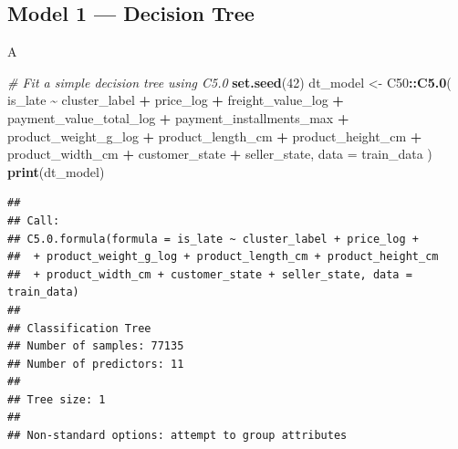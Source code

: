 \documentclass[
]{article}
\newenvironment{Shaded}{\begin{snugshade}}{\end{snugshade}}
\newcommand{\AttributeTok}[1]{\textcolor[rgb]{0.13,0.29,0.53}{#1}}
\newcommand{\CommentTok}[1]{\textcolor[rgb]{0.56,0.35,0.01}{\textit{#1}}}
\newcommand{\DecValTok}[1]{\textcolor[rgb]{0.00,0.00,0.81}{#1}}
\newcommand{\FunctionTok}[1]{\textcolor[rgb]{0.13,0.29,0.53}{\textbf{#1}}}
\newcommand{\NormalTok}[1]{#1}
\newcommand{\OtherTok}[1]{\textcolor[rgb]{0.56,0.35,0.01}{#1}}
\newcommand{\SpecialCharTok}[1]{\textcolor[rgb]{0.81,0.36,0.00}{\textbf{#1}}}
\newcommand{\StringTok}[1]{\textcolor[rgb]{0.31,0.60,0.02}{#1}}
\begin{document}
\subsection{Model 1 --- Decision Tree}\label{model-1-decision-tree}

A

\begin{Shaded}
\begin{Highlighting}[]
\CommentTok{\# Fit a simple decision tree using C5.0}
\FunctionTok{set.seed}\NormalTok{(}\DecValTok{42}\NormalTok{)}
\NormalTok{dt\_model }\OtherTok{\textless{}{-}}\NormalTok{ C50}\SpecialCharTok{::}\FunctionTok{C5.0}\NormalTok{(}
\NormalTok{  is\_late }\SpecialCharTok{\textasciitilde{}}\NormalTok{ cluster\_label }\SpecialCharTok{+}\NormalTok{ price\_log }\SpecialCharTok{+}\NormalTok{ freight\_value\_log }\SpecialCharTok{+}\NormalTok{ payment\_value\_total\_log}
    \SpecialCharTok{+}\NormalTok{ payment\_installments\_max }\SpecialCharTok{+}\NormalTok{ product\_weight\_g\_log }\SpecialCharTok{+}\NormalTok{ product\_length\_cm}
    \SpecialCharTok{+}\NormalTok{ product\_height\_cm }\SpecialCharTok{+}\NormalTok{ product\_width\_cm }\SpecialCharTok{+}\NormalTok{ customer\_state}
    \SpecialCharTok{+}\NormalTok{ seller\_state, }
  \AttributeTok{data =}\NormalTok{ train\_data}
\NormalTok{)}
\FunctionTok{print}\NormalTok{(dt\_model)}
\end{Highlighting}
\end{Shaded}

\begin{verbatim}
## 
## Call:
## C5.0.formula(formula = is_late ~ cluster_label + price_log +
##  + product_weight_g_log + product_length_cm + product_height_cm
##  + product_width_cm + customer_state + seller_state, data = train_data)
## 
## Classification Tree
## Number of samples: 77135 
## Number of predictors: 11 
## 
## Tree size: 1 
## 
## Non-standard options: attempt to group attributes
\end{verbatim}

\begin{Shaded}
\end{Shaded}
\end{document}

